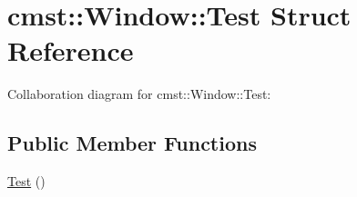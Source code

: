 \hypertarget{structcmst_1_1_window_1_1_test}{}\section{cmst\+:\+:Window\+:\+:Test Struct Reference}
\label{structcmst_1_1_window_1_1_test}


Collaboration diagram for cmst\+:\+:Window\+:\+:Test\+:
\subsection*{Public Member Functions}
\begin{DoxyCompactItemize}
\item 
\hyperlink{structcmst_1_1_window_1_1_test_af1e9b5fcdbaa7d5ba758571e06e41952}{Test} ()
\end{DoxyCompactItemize}
